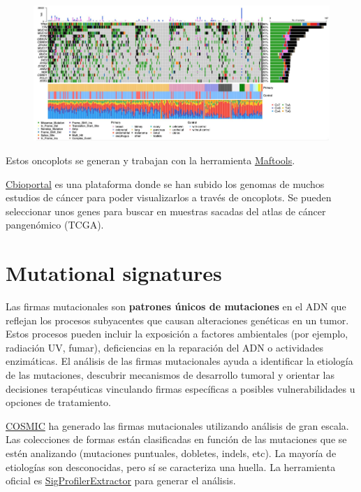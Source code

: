 \begin{figure}[htbp]
\centering
\includegraphics[width = \textwidth]{figs/oncoplot.png}
\end{figure}

Estos oncoplots se generan y trabajan con la herramienta \href{https://bioconductor.org/packages/devel/bioc/vignettes/maftools/inst/doc/maftools.html}{Maftools}. 

\href{https://www.cbioportal.org/}{Cbioportal} es una plataforma donde se han subido los genomas de muchos estudios de cáncer para poder visualizarlos a través de oncoplots. Se pueden seleccionar unos genes para buscar en muestras sacadas del atlas de cáncer pangenómico (TCGA). 

\section{Mutational signatures}
Las firmas mutacionales son \textbf{patrones únicos de mutaciones} en el ADN que reflejan los procesos subyacentes que causan alteraciones genéticas en un tumor. Estos procesos pueden incluir la exposición a factores ambientales (por ejemplo, radiación UV, fumar), deficiencias en la reparación del ADN o actividades enzimáticas. El análisis de las firmas mutacionales ayuda a identificar la etiología de las mutaciones, descubrir mecanismos de desarrollo tumoral y orientar las decisiones terapéuticas vinculando firmas específicas a posibles vulnerabilidades u opciones de tratamiento.

\href{https://cancer.sanger.ac.uk/signatures/}{COSMIC} ha generado las firmas mutacionales utilizando análisis de gran escala. Las colecciones de formas están clasificadas en función de las mutaciones que se estén analizando (mutaciones puntuales, dobletes, indels, etc). La mayoría de etiologías son desconocidas, pero sí se caracteriza una huella. La herramienta oficial es \href{https://github.com/AlexandrovLab/SigProfilerExtractor}{SigProfilerExtractor} para generar el análisis.

